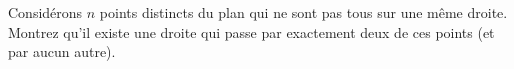 Considérons $n$ points distincts du plan qui ne sont pas tous sur une même droite.
Montrez qu'il existe une droite qui passe par exactement deux de ces points (et par aucun autre).
